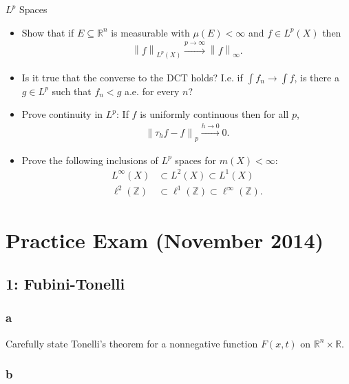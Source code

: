 \(L^p\) Spaces

\begin{itemize}
\tightlist
\item
  Show that if \(E\subseteq {\mathbb{R}}^n\) is measurable with
  \(\mu(E) < \infty\) and \(f\in L^p(X)\) then
  \begin{align*}{\left\lVert {f} \right\rVert}_{L^p(X)} \overset{p\to\infty}\to {\left\lVert {f} \right\rVert}_\infty.\end{align*}
\item
  Is it true that the converse to the DCT holds? I.e. if
  \(\int f_n \to \int f\), is there a \(g\in L^p\) such that \(f_n < g\)
  a.e. for every \(n\)?
\item
  Prove continuity in \(L^p\): If \(f\) is uniformly continuous then for
  all \(p\),
  \begin{align*}{\left\lVert {\tau_h f - f} \right\rVert}_p \overset{h\to 0}\to 0.\end{align*}
\item
  Prove the following inclusions of \(L^p\) spaces for
  \(m(X) < \infty\):
  \begin{align*}
  L^\infty(X) &\subset L^2(X) \subset L^1(X) \\
  \ell^2({\mathbb{Z}}) &\subset \ell^1({\mathbb{Z}}) \subset \ell^\infty({\mathbb{Z}})
  .\end{align*}
\end{itemize}

\hypertarget{practice-exam-november-2014}{%
\section{Practice Exam (November
2014)}\label{practice-exam-november-2014}}

\hypertarget{fubini-tonelli}{%
\subsection{1: Fubini-Tonelli}\label{fubini-tonelli}}

\hypertarget{a}{%
\subsubsection{a}\label{a}}

Carefully state Tonelli's theorem for a nonnegative function \(F(x, t)\)
on \({\mathbb{R}}^n\times{\mathbb{R}}\).

\hypertarget{b}{%
\subsubsection{b}\label{b}}

